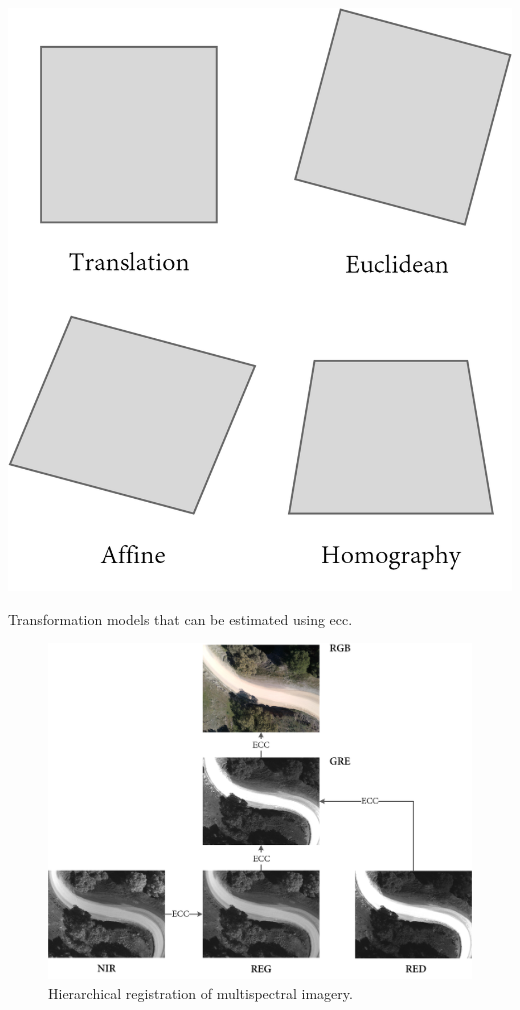 \begin{marginfigure}[-2cm]
    \centering
    \includegraphics{figs/image_fusion/motion_models.png}
    \caption{Transformation models that can be estimated using \acrshort{ecc}.}
    \label{fig:ecc_motion_models}
\end{marginfigure}

\begin{figure}[ht]
    \centering
    \includegraphics[width=\linewidth]{figs/image_fusion/ecc_hierarchy.png}
    \caption{Hierarchical registration of multispectral imagery.}
	\label{fig:ecc_hierarchy}
\end{figure}

